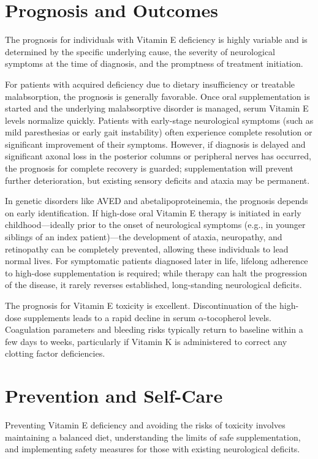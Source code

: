 \section*{Prognosis and Outcomes}
The prognosis for individuals with Vitamin E deficiency is highly variable and is determined by the specific underlying cause, the severity of neurological symptoms at the time of diagnosis, and the promptness of treatment initiation.

For patients with acquired deficiency due to dietary insufficiency or treatable malabsorption, the prognosis is generally favorable. Once oral supplementation is started and the underlying malabsorptive disorder is managed, serum Vitamin E levels normalize quickly. Patients with early-stage neurological symptoms (such as mild paresthesias or early gait instability) often experience complete resolution or significant improvement of their symptoms. However, if diagnosis is delayed and significant axonal loss in the posterior columns or peripheral nerves has occurred, the prognosis for complete recovery is guarded; supplementation will prevent further deterioration, but existing sensory deficits and ataxia may be permanent.

In genetic disorders like AVED and abetalipoproteinemia, the prognosis depends on early identification. If high-dose oral Vitamin E therapy is initiated in early childhood—ideally prior to the onset of neurological symptoms (e.g., in younger siblings of an index patient)—the development of ataxia, neuropathy, and retinopathy can be completely prevented, allowing these individuals to lead normal lives. For symptomatic patients diagnosed later in life, lifelong adherence to high-dose supplementation is required; while therapy can halt the progression of the disease, it rarely reverses established, long-standing neurological deficits.

The prognosis for Vitamin E toxicity is excellent. Discontinuation of the high-dose supplements leads to a rapid decline in serum $\alpha$-tocopherol levels. Coagulation parameters and bleeding risks typically return to baseline within a few days to weeks, particularly if Vitamin K is administered to correct any clotting factor deficiencies.

\section*{Prevention and Self-Care}
Preventing Vitamin E deficiency and avoiding the risks of toxicity involves maintaining a balanced diet, understanding the limits of safe supplementation, and implementing safety measures for those with existing neurological deficits.

